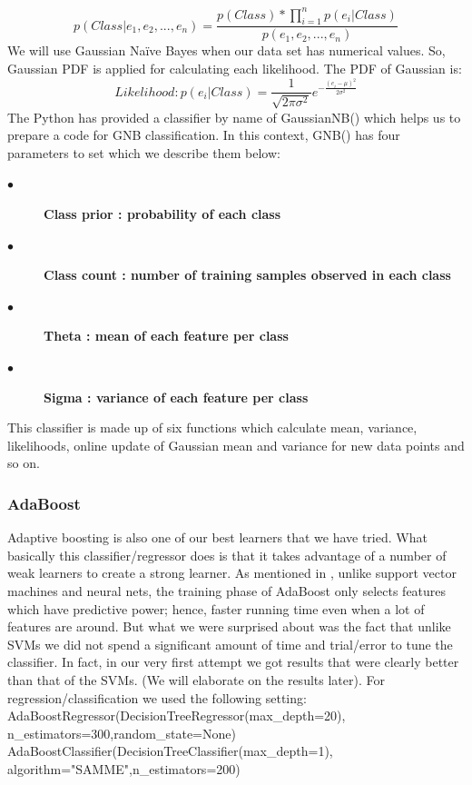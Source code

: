 \documentclass[journal,transmag]{IEEEtran}
\begin{document}
\begin{equation} \label{eq3}
p(Class | e_1,e_2,...,e_n)  = \frac{p(Class)*\prod_{i=1} ^n p(e_i|Class)}{p(e_1,e_2,...,e_n)} 
\end{equation}
We will use Gaussian Naïve Bayes when our data set has numerical values. So, Gaussian PDF is applied for calculating each likelihood. The PDF of Gaussian is:
\begin{equation} \label{eq4}
Likelihood: p(e_i | Class)  =\frac{1}{\sqrt{2\pi \sigma^2}} e^{-\frac{(e_i-\mu)^2 }{2\sigma^2}}
\end{equation}
The Python has provided a classifier by name of GaussianNB() which helps us to prepare a code for GNB classification. In this context, GNB() has four parameters to set which we describe them below:
	\begin{description}
          \item[$\bullet$] \bf{Class prior} : probability of each class
          \item[$\bullet$] \bf{Class count} : number of training samples observed in each class
          \item[$\bullet$] \bf{Theta } : mean of each feature per class
          \item[$\bullet$] \bf{Sigma} : variance of each feature per class
            \end{description}
This classifier is made up of six functions which calculate mean, variance, likelihoods, online update of Gaussian mean and variance for new data points and so on.


			\subsubsection{AdaBoost}
			\label{adaboost}
			Adaptive boosting is also one of our best learners that we have tried. What basically this classifier/regressor does is that it takes advantage of a number of weak learners to create a strong learner. As mentioned in \cite{adaboost}, unlike support vector machines and neural nets, the training phase of AdaBoost only selects features which have predictive power; hence, faster running time even when a lot of features are around. But what we were surprised about was the fact that unlike SVMs we did not spend a significant amount of time and trial/error to tune the classifier. In fact, in our very first attempt we got results that were clearly better than that of the SVMs. (We will elaborate on the results later). For regression/classification we used the following setting:\\
AdaBoostRegressor(DecisionTreeRegressor(max\_depth=20),\\
n\_estimators=300,random\_state=None)\\
AdaBoostClassifier(DecisionTreeClassifier(max\_depth=1),\\
algorithm="SAMME",n\_estimators=200)
\end{document}

